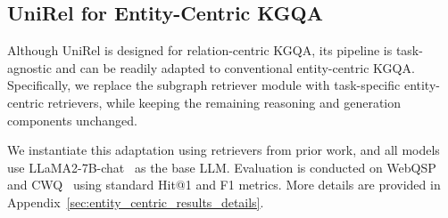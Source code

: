 \begin{table}[t]
\centering
\caption{Comparison results for entity-centric KGQA.}
\label{tab:entity_centric}
\vspace{-1em}
\end{table}


\subsection{UniRel for Entity-Centric KGQA}
Although UniRel is designed for relation-centric KGQA, its pipeline is task-agnostic and can be readily adapted to conventional entity-centric KGQA.
Specifically, we replace the subgraph retriever module with task-specific entity-centric retrievers, while keeping the remaining reasoning and generation components unchanged.

We instantiate this adaptation using retrievers from prior work, and all models use LLaMA2-7B-chat~\cite{touvron2023llama} as the base LLM.
Evaluation is conducted on  WebQSP~\cite{yih2016value} and CWQ~\cite{talmor2018web} using standard Hit@1 and F1 metrics. More details are provided in Appendix~\ref{sec:entity_centric_results_details}.


